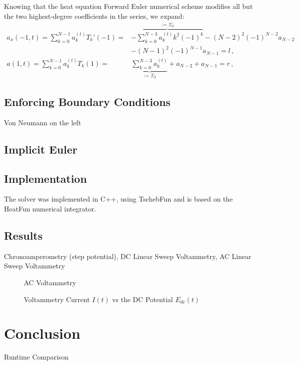 \documentclass{prettytex/ox/mmsc-special-topic}
\begin{document}
  Knowing that the heat equation Forward Euler numerical scheme modifies all but the two highest-degree coefficients in the series, we expand:
  \begin{align*}
    a_x(-1, t) = \sum_{k=0}^{N-1} a_k^{(t)} T_k'(-1) =   & \overbrace{-\sum_{k=0}^{N-3} a_k^{(t)} k^2 (-1)^{k}}^{:= \Sigma_3} - (N-2)^2 (-1)^{N-2} a_{N-2}                  \\
                                                         & -(N-1)^2 (-1)^{N-1} a_{N-1} = l\,,                                                                               \\
    a(1, t)    = \sum_{k=0}^{N-1} a_k^{(t)} T_k(1)     = & \underbrace{\sum_{k=0}^{N-3} a_k^{(t)}}_{:= \Sigma_2}              + a_{N-2}                    + a_{N-1} = r\,,
  \end{align*}

  \subsection{Enforcing Boundary Conditions}
  Von Neumann on the left

  \subsection{Implicit Euler}

  \subsection{Implementation}
  The solver was implemented in C++, using TschebFun and is based on the HeatFun numerical integrator.


  \subsection{Results}
  Chronoamperometry (step potential),
  DC Linear Sweep Voltammetry,
  AC Linear Sweep Voltammetry

  \begin{figure}[H]
    \centering
    \caption{AC Voltammetry}
    \label{fig:ac-voltammetry}
  \end{figure}

  \begin{figure}[H]
    \centering
    \caption{Voltammetry Current $I(t)$ vs the DC Potential $E_{dc}(t)$}
    \label{fig:voltammetry-current}
  \end{figure}

  \section{Conclusion}

  \begin{table}
    \caption{Runtime Comparison}
  \end{table}

  \pagebreak
  \printbibliography
  \printnoidxglossary[type=acronym]
\end{document}
